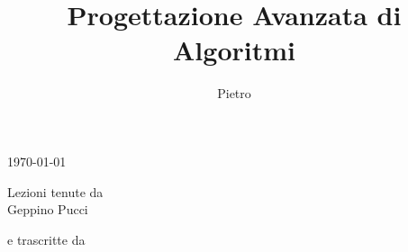 \title{Progettazione Avanzata di Algoritmi}

\author{Pietro}

\makeatletter
\begin{titlepage}
	
	\begin{center}
		\vspace*{6cm}

		{\LARGE\bfseries \@title} %
		\vspace*{0.75cm}

        {\today}

        \vspace*{3.25cm}



        Lezioni tenute da\\
        Geppino Pucci

        \vspace*{0.5cm}

        e trascritte da\\
        \@author

    \end{center}

\end{titlepage}
\makeatother

